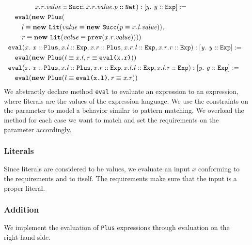 \begin{align*}
&\qquad\qquad
                  \mathit{x.r.value} :: \mathit{\texttt{Succ}},
                  \mathit{x.r.value.p} :: \mathit{\texttt{Nat}}
              ): [y.\ \mathit{\mathit{y} :: \mathit{\texttt{Exp}}}] :=\\
&\quad\texttt{eval}(
           \textbf{new } \texttt{Plus}(\\
             &\qquad\mathit{l} \equiv \mathit{
               \textbf{new } \mathit{\texttt{Lit}}(\mathit{\mathit{value} \equiv \mathit{ \textbf{new } \mathit{\texttt{Succ}}(\mathit{\mathit{p} \equiv \mathit{x.l.value}})}})},\\
             &\qquad\mathit{r} \equiv \mathit{
               \textbf{new } \mathit{\texttt{Lit}}(\mathit{\mathit{value} \equiv \mathit{\texttt{prev}(x.r.\mathit{value})}})}
           )
         )\\
&\mathit{\texttt{eval}}(\mathit{x}.\ \mathit{\mathit{x} :: \mathit{\texttt{Plus}},
        \mathit{x.l} :: \mathit{\texttt{Exp}},
        \mathit{x.r} :: \mathit{\texttt{Plus}},
        \mathit{x.r.l} :: \mathit{\texttt{Exp}},
        \mathit{x.r.r} :: \mathit{\texttt{Exp}}}): \mathit{[y.\ \mathit{\mathit{y} :: \mathit{\texttt{Exp}}}]} := \mathit{}\\
       &\quad\texttt{eval}(
         \textbf{new } \mathit{\texttt{Plus}}(\mathit{
                     \mathit{l} \equiv \mathit{x.l},
                     \mathit{r} \equiv \mathit{\texttt{eval(x.r)}}
                   })
       )\\
&\mathit{\texttt{eval}}(\mathit{x}.\ \mathit{\mathit{x} :: \mathit{\texttt{Plus}},
        \mathit{x.l} :: \mathit{\texttt{Plus}},
        \mathit{x.r} :: \mathit{\texttt{Exp}},
        \mathit{x.l.l} :: \mathit{\texttt{Exp}},
        \mathit{x.l.r} :: \mathit{\texttt{Exp}}}): \mathit{[y.\ \mathit{\mathit{y} :: \mathit{\texttt{Exp}}}]} := \mathit{}\\
       &\quad\texttt{eval}(
         \textbf{new } \mathit{\texttt{Plus}}(\mathit{
                     \mathit{l} \equiv \mathit{\texttt{eval(x.l)}},
                     \mathit{r} \equiv \mathit{x.r}
                   })
       )
\end{align*}
We abstractly declare method \texttt{eval}
to evaluate an expression to an expression,
where literals are the values of the expression language.
We use the constraints on the parameter to
model a behavior similar to pattern matching.
We overload the method for each case
we want to match and set the requirements
on the parameter accordingly.

\subsubsection{Literals}
Since literals are considered to be values,
we evaluate an input $x$ conforming to the requirements
 and  to itself.
The requirements make sure that the input is a proper literal.

\subsubsection{Addition}
We implement the evaluation of \texttt{Plus} expressions
through evaluation on the right-hand side.




